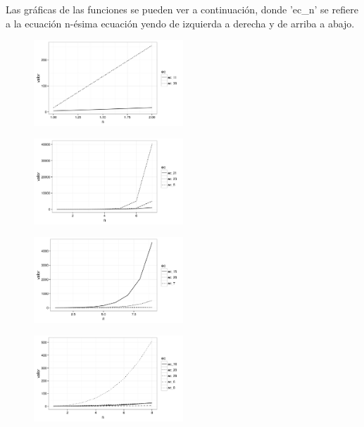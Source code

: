 \documentclass{article}
\begin{document}
Las gráficas de las funciones se pueden ver a continuación, donde 'ec\_n' se refiere a la ecuación n-ésima ecuación yendo de izquierda a derecha y de arriba a abajo.


\begin{figure}[H]
\centering
\includegraphics[width=0.5\textwidth]{img/graf_01.png}
\end{figure}

\begin{figure}[H]
\centering
\includegraphics[width=0.5\textwidth]{img/graf_02.png}
\end{figure}

\begin{figure}[H]
\centering
\includegraphics[width=0.5\textwidth]{img/graf_03.png}
\end{figure}

\begin{figure}[H]
\centering
\includegraphics[width=0.5\textwidth]{img/graf_04.png}
\end{figure}
\end{document}
